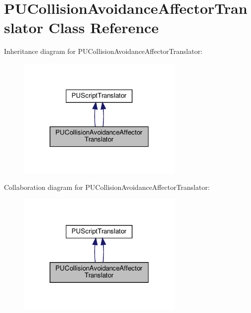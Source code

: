 \hypertarget{classPUCollisionAvoidanceAffectorTranslator}{}\section{P\+U\+Collision\+Avoidance\+Affector\+Translator Class Reference}
\label{classPUCollisionAvoidanceAffectorTranslator}


Inheritance diagram for P\+U\+Collision\+Avoidance\+Affector\+Translator\+:
\nopagebreak
\begin{figure}[H]
\begin{center}
\leavevmode
\includegraphics[width=229pt]{classPUCollisionAvoidanceAffectorTranslator__inherit__graph}
\end{center}
\end{figure}


Collaboration diagram for P\+U\+Collision\+Avoidance\+Affector\+Translator\+:
\nopagebreak
\begin{figure}[H]
\begin{center}
\leavevmode
\includegraphics[width=229pt]{classPUCollisionAvoidanceAffectorTranslator__coll__graph}
\end{center}
\end{figure}
